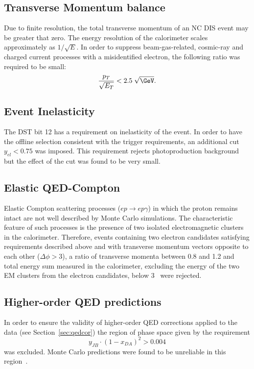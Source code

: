 \subsection{Transverse Momentum balance}
\label{subsec:empzcut}
Due to finite resolution, the total transverse momentum of an NC DIS event may be greater that zero. The energy resolution of the calorimeter scales approximately as $1/\sqrt{E}$. In order to suppress beam-gas-related, cosmic-ray and charged current processes with a misidentified electron, the following ratio was required to be small:
\begin{equation}
\frac{p_T}{\sqrt{E_T}} < 2.5\;\sqrt{\GeV}.
\label{eq:ptcut}
\end{equation}

\subsection{Event Inelasticity}
\label{subsec:yelcut}

The DST bit 12 has a requirement on inelasticity of the event. In order to have the offline selection consistent with the trigger requirements, an additional cut $y_{el} < 0.75$ was imposed. This requirement rejects photoproduction background but the effect of the cut was found to be very small.

\subsection{Elastic QED-Compton}
\label{subsec:elasticqedcut}
Elastic Compton scattering processes ($ep \rightarrow ep\gamma$) in which the proton remains intact are not well described by Monte Carlo simulations. The characteristic feature of such processes is the presence of two isolated electromagnetic clusters in the calorimeter. Therefore, events containing two electron candidates satisfying requirements described above and with transverse momentum vectors opposite to each other ($\Delta\phi > 3$), a ratio of transverse momenta between 0.8 and 1.2 and total energy sum measured in the calorimeter, excluding the energy of the two EM clusters from the electron candidates, below 3 \GeV~were rejected.

\subsection{Higher-order QED predictions}
\label{subsec:qedcorcut}
In order to ensure the validity of higher-order QED corrections applied to the data (see Section~\ref{sec:qedcor}) the region of phase space given by the requirement 
\begin{equation}
y_{JB}\cdot\left(1-x_{DA}\right)^2>0.004
\end{equation}
was excluded. Monte Carlo predictions were found to be unreliable in this region~\cite{cpc:81:381}.

